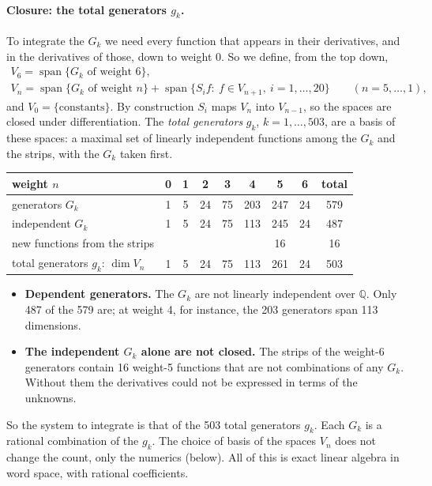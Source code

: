 \documentclass[11pt]{article}
\begin{document}
\paragraph{Closure: the total generators $g_k$.} To integrate the $G_k$ we need every function that appears in their
derivatives, and in the derivatives of those, down to weight 0. So we define, from the top down,
\begin{gather*}
  V_6=\operatorname{span}\{G_k\text{ of weight 6}\},\\
  V_n=\operatorname{span}\{G_k\text{ of weight }n\}+\operatorname{span}\{S_if:\ f\in V_{n+1},\ i=1,\dots,20\}
  \qquad(n=5,\dots,1),
\end{gather*}
and $V_0=\{\text{constants}\}$. By construction $S_i$ maps $V_n$ into $V_{n-1}$, so the spaces are closed under
differentiation. The \emph{total generators} $g_k$, $k=1,\dots,503$, are a basis of these spaces: a maximal set of
linearly independent functions among the $G_k$ and the strips, with the $G_k$ taken first.
\begin{center}
\begin{tabular}{lccccccc|c}\toprule
weight $n$ & 0 & 1 & 2 & 3 & 4 & 5 & 6 & total \\ \midrule
generators $G_k$ & 1 & 5 & 24 & 75 & 203 & 247 & 24 & 579 \\
independent $G_k$ & 1 & 5 & 24 & 75 & 113 & 245 & 24 & 487 \\
new functions from the strips & & & & & & 16 & & 16 \\
total generators $g_k$: $\dim V_n$ & 1 & 5 & 24 & 75 & 113 & 261 & 24 & 503 \\ \bottomrule
\end{tabular}
\end{center}
\begin{itemize}
\item \textbf{Dependent generators.} The $G_k$ are not linearly independent over $\mathbb Q$. Only 487 of the 579
  are; at weight 4, for instance, the 203 generators span 113 dimensions.
\item \textbf{The independent $G_k$ alone are not closed.} The strips of the weight-6 generators contain 16 weight-5
  functions that are not combinations of any $G_k$. Without them the derivatives could not be expressed in terms of
  the unknowns.
\end{itemize}
So the system to integrate is that of the 503 total generators $g_k$. Each $G_k$ is a rational combination of the
$g_k$. The choice of basis of the spaces $V_n$ does not change the count, only the numerics (below). All of this is
exact linear algebra in word space, with rational coefficients.
\end{document}
